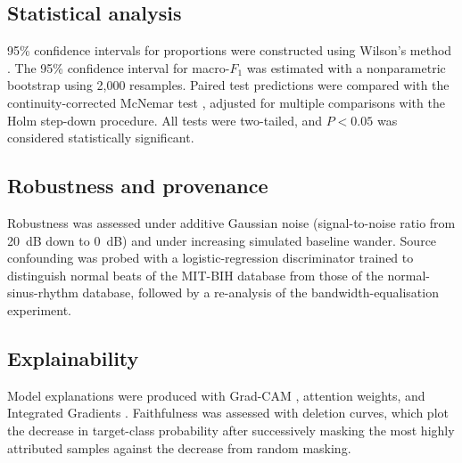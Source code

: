 \subsection{Statistical analysis}

95\% confidence intervals for proportions were constructed using Wilson's
method \cite{wilson1927}. The 95\% confidence interval for macro-$F_1$ was
estimated with a nonparametric bootstrap using 2,000 resamples. Paired test
predictions were compared with the continuity-corrected McNemar test
\cite{mcnemar1947}, adjusted for multiple comparisons with the Holm
step-down procedure. All tests were two-tailed, and $P < 0.05$ was
considered statistically significant.

\subsection{Robustness and provenance}

Robustness was assessed under additive Gaussian noise (signal-to-noise
ratio from 20~dB down to 0~dB) and under increasing simulated baseline
wander. Source confounding was probed with a logistic-regression
discriminator trained to distinguish normal beats of the MIT-BIH database
from those of the normal-sinus-rhythm database, followed by a re-analysis
of the bandwidth-equalisation experiment.

\subsection{Explainability}

Model explanations were produced with Grad-CAM \cite{selvaraju2017gradcam},
attention weights, and Integrated Gradients \cite{sundararajan2017integrated}.
Faithfulness was assessed with deletion curves, which plot the decrease in
target-class probability after successively masking the most highly
attributed samples against the decrease from random masking.